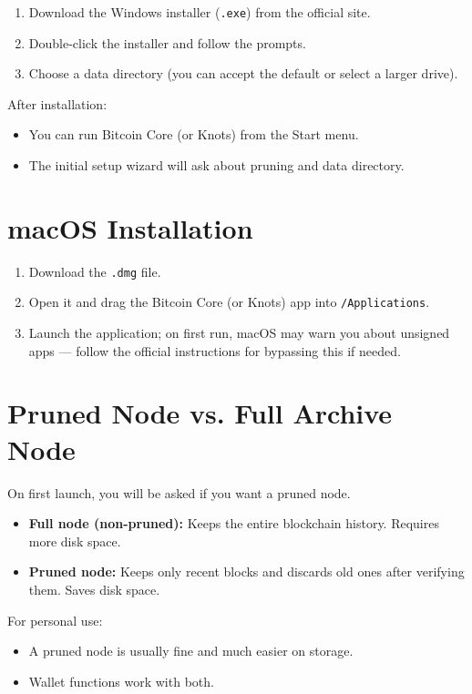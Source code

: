 \documentclass[12pt,a4paper]{book}
\begin{document}
\begin{enumerate}
  \item Download the Windows installer (\texttt{.exe}) from the official site.
  \item Double-click the installer and follow the prompts.
  \item Choose a data directory (you can accept the default or select a larger drive).
\end{enumerate}

After installation:
\begin{itemize}
  \item You can run Bitcoin Core (or Knots) from the Start menu.
  \item The initial setup wizard will ask about pruning and data directory.
\end{itemize}

\section{macOS Installation}

\begin{enumerate}
  \item Download the \texttt{.dmg} file.
  \item Open it and drag the Bitcoin Core (or Knots) app into \texttt{/Applications}.
  \item Launch the application; on first run, macOS may warn you about unsigned apps --- follow the official instructions for bypassing this if needed.
\end{enumerate}

\section{Pruned Node vs. Full Archive Node}

On first launch, you will be asked if you want a pruned node.

\begin{itemize}
  \item \textbf{Full node (non-pruned):} Keeps the entire blockchain history. Requires more disk space.
  \item \textbf{Pruned node:} Keeps only recent blocks and discards old ones after verifying them. Saves disk space.
\end{itemize}

For personal use:
\begin{itemize}
  \item A pruned node is usually fine and much easier on storage.
  \item Wallet functions work with both.
\end{itemize}
\end{document}
